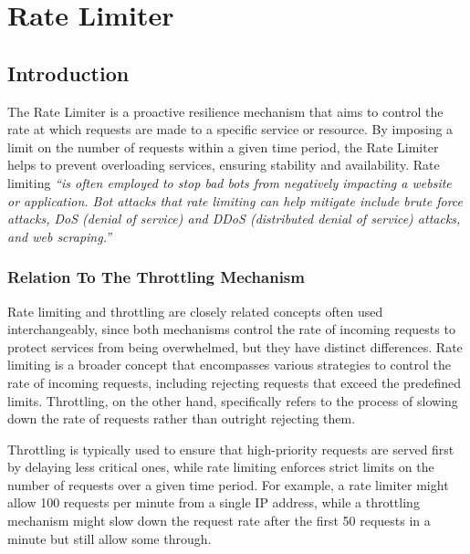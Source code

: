 \chapter{Rate Limiter}\label{ch:rate-limiter}



\section{Introduction}\label{sec:rate-limiter-introduction}

The Rate Limiter is a proactive resilience mechanism
that aims to control the rate at which requests are made to a specific service or resource.
By imposing a limit on the number of requests within a given time period,
the Rate Limiter helps to prevent overloading services,
ensuring stability and availability.
Rate limiting \textit{\enquote{is often employed to stop bad bots from negatively impacting a website or application.
Bot attacks that rate limiting can help mitigate include brute force attacks, DoS (denial of service)
    and DDoS (distributed denial of service) attacks, and web scraping.}}~\cite{cloudflare-rate-limiting}

\subsection{Relation To The Throttling Mechanism}\label{subsec:rate-limiter-throttling}

Rate limiting and throttling are closely related concepts often used interchangeably,
since both mechanisms control the rate of incoming requests to protect services from being overwhelmed, but they have distinct differences.
Rate limiting is a broader concept that encompasses various strategies to control the rate of incoming requests, including rejecting requests that exceed the predefined limits.
Throttling, on the other hand, specifically refers to the process of slowing down the rate of requests rather than outright rejecting them.

Throttling is typically used to ensure that high-priority requests are served first by delaying less critical ones,
while rate limiting enforces strict limits on the number of requests over a given time period.
For example, a rate limiter might allow 100 requests per minute from a single IP address, while a throttling mechanism might slow down the request rate after the first 50 requests in a minute but still allow some through.
